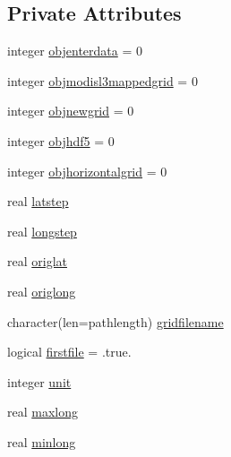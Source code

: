 \subsection*{Private Attributes}
\begin{DoxyCompactItemize}
\item 
integer \mbox{\hyperlink{structmoduleconvertmodisl2_1_1t__modisl2format_a5fa81d36a554921dba7b1288274d7523}{objenterdata}} = 0
\item 
integer \mbox{\hyperlink{structmoduleconvertmodisl2_1_1t__modisl2format_a89be16d8f5971c36750b269dc3c21cfd}{objmodisl3mappedgrid}} = 0
\item 
integer \mbox{\hyperlink{structmoduleconvertmodisl2_1_1t__modisl2format_a6a81dd0e4f447b67c968662ca28ff5ee}{objnewgrid}} = 0
\item 
integer \mbox{\hyperlink{structmoduleconvertmodisl2_1_1t__modisl2format_a81ed265d80e43d43b628e0c82103435a}{objhdf5}} = 0
\item 
integer \mbox{\hyperlink{structmoduleconvertmodisl2_1_1t__modisl2format_a0cbf2fc980bf7221ac3e567be01be8b2}{objhorizontalgrid}} = 0
\item 
real \mbox{\hyperlink{structmoduleconvertmodisl2_1_1t__modisl2format_a05bccef2c4b115846afab39f7bb29838}{latstep}}
\item 
real \mbox{\hyperlink{structmoduleconvertmodisl2_1_1t__modisl2format_aa12eb8e485089a56aee7d0cb286bcd0b}{longstep}}
\item 
real \mbox{\hyperlink{structmoduleconvertmodisl2_1_1t__modisl2format_ae0a6beadf0054b94b04026efb2593674}{origlat}}
\item 
real \mbox{\hyperlink{structmoduleconvertmodisl2_1_1t__modisl2format_a589e698c3b036ffa2e683f0462e127e8}{origlong}}
\item 
character(len=pathlength) \mbox{\hyperlink{structmoduleconvertmodisl2_1_1t__modisl2format_a5d1bfa6d8bb5366ee0f747b498e49f76}{gridfilename}}
\item 
logical \mbox{\hyperlink{structmoduleconvertmodisl2_1_1t__modisl2format_ada5eb7e34b75de179f5051b1b9b5fbe3}{firstfile}} = .true.
\item 
integer \mbox{\hyperlink{structmoduleconvertmodisl2_1_1t__modisl2format_af8af4583b1fcb7f4181b7339c31eabfd}{unit}}
\item 
real \mbox{\hyperlink{structmoduleconvertmodisl2_1_1t__modisl2format_af7a5f61afc773768b627bbf830f19fa6}{maxlong}}
\item 
real \mbox{\hyperlink{structmoduleconvertmodisl2_1_1t__modisl2format_a98cabfd287626138cf13bcb21da0eeb3}{minlong}}

\end{DoxyCompactItemize}
